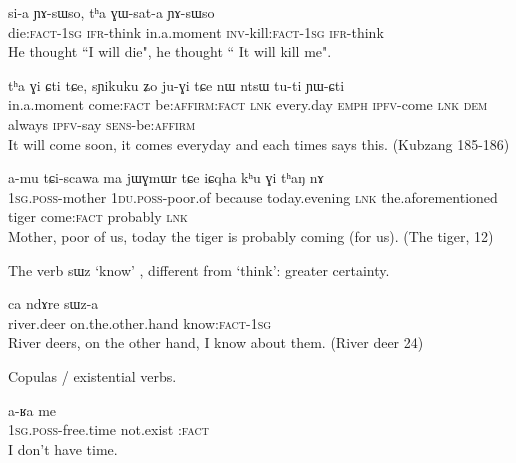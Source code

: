 \documentclass[oldfontcommands,oneside,a4paper,11pt]{article}
\newcommand{\ipa}[1]{{\phon \mbox{#1}}} %
\newcommand{\factual}[1]{\textsc{:fact}}
\begin{document}
\begin{exe}
\ex \label{ex:GWsata}
\gll
\ipa{si-a}   \ipa{ɲɤ-sɯso,} \ipa{tʰa}  	\ipa{ɣɯ-sat-a}  \ipa{ɲɤ-sɯso} \\
die:\textsc{fact-1sg} \textsc{ifr}-think in.a.moment \textsc{inv}-kill:\textsc{fact-1sg} \textsc{ifr}-think \\
\glt He thought ``I will die", he thought `` It will kill me".
\end{exe}

\begin{exe}
\ex \label{ex:Gi.Cti}
\gll
 	\ipa{tʰa} 	\ipa{ɣi} 	\ipa{ɕti} 	\ipa{tɕe,} 	\ipa{sɲikuku} 	\ipa{ʑo} 	\ipa{ju-ɣi} 	\ipa{tɕe} 	\ipa{nɯ} 	\ipa{ntsɯ} 	\ipa{tu-ti} 	\ipa{ɲɯ-ɕti} 	\\
 in.a.moment come\factual{} be:\textsc{affirm}\factual{} \textsc{lnk} every.day \textsc{emph} \textsc{ipfv}-come \textsc{lnk} \textsc{dem} always \textsc{ipfv}-say \textsc{sens}-be:\textsc{affirm} \\
\glt It will come  soon, it comes everyday and each times says this. (Kubzang 185-186)
\end{exe}

\begin{exe}
\ex \label{ex:Gi.thaN}
\gll
 \ipa{a-mu} 	\ipa{tɕi-scawa} 	\ipa{ma} 	\ipa{jɯɣmɯr} 	\ipa{tɕe} 	\ipa{iɕqha} 	\ipa{kʰu} 	\ipa{ɣi} 	\ipa{tʰaŋ} 	\ipa{nɤ} 	\\
 \textsc{1sg.poss}-mother  \textsc{1du.poss}-poor.of because today.evening \textsc{lnk} the.aforementioned tiger  come\factual{} probably \textsc{lnk} \\
\glt Mother, poor of us, today the tiger is probably coming (for us). (The tiger, 12)
 \end{exe}
 
  
 
The verb \ipa{sɯz}  `know' , different from `think': greater certainty.
  
 \begin{exe}
\ex \label{ex:sWza}
\gll
 \ipa{ca}  	\ipa{ndɤre}  	\ipa{sɯz-a}  \\
 river.deer on.the.other.hand know:\textsc{fact-1sg} \\
\glt  River deers, on the other hand, I know about them. (River deer 24)
 \end{exe}
 
 
 Copulas / existential verbs.
  
 
  \begin{exe}
\ex \label{ex:aRa.me}
\gll
 	\ipa{a-ʁa}  	\ipa{me}  \\
\textsc{1sg.poss}-free.time  not.exist \factual{} \\
\glt  I don't have time.
 \end{exe}
 
\end{document}
